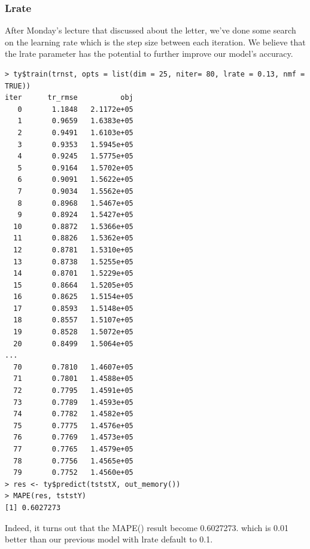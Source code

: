 \documentclass[11pt]{article}
\newcommand\tab[1][0.5cm]{\hspace*{#1}}
\begin{document}
\subsubsection{Lrate}
\tab{}After Monday's lecture that discussed about the letter, we've done some search on the learning rate which is the step size between each iteration. We believe that the lrate parameter has the potential to further improve our model's accuracy.
\begin{verbatim}
> ty$train(trnst, opts = list(dim = 25, niter= 80, lrate = 0.13, nmf = TRUE))
iter      tr_rmse          obj
   0       1.1848   2.1172e+05
   1       0.9659   1.6383e+05
   2       0.9491   1.6103e+05
   3       0.9353   1.5945e+05
   4       0.9245   1.5775e+05
   5       0.9164   1.5702e+05
   6       0.9091   1.5622e+05
   7       0.9034   1.5562e+05
   8       0.8968   1.5467e+05
   9       0.8924   1.5427e+05
  10       0.8872   1.5366e+05
  11       0.8826   1.5362e+05
  12       0.8781   1.5310e+05
  13       0.8738   1.5255e+05
  14       0.8701   1.5229e+05
  15       0.8664   1.5205e+05
  16       0.8625   1.5154e+05
  17       0.8593   1.5148e+05
  18       0.8557   1.5107e+05
  19       0.8528   1.5072e+05
  20       0.8499   1.5064e+05
...
  70       0.7810   1.4607e+05
  71       0.7801   1.4588e+05
  72       0.7795   1.4591e+05
  73       0.7789   1.4593e+05
  74       0.7782   1.4582e+05
  75       0.7775   1.4576e+05
  76       0.7769   1.4573e+05
  77       0.7765   1.4579e+05
  78       0.7756   1.4565e+05
  79       0.7752   1.4560e+05
> res <- ty$predict(tststX, out_memory())
> MAPE(res, tststY)
[1] 0.6027273
\end{verbatim}
\tab{}Indeed, it turns out that the MAPE() result become 0.6027273. which is 0.01 better than our previous model with lrate default to 0.1.
\end{document}
